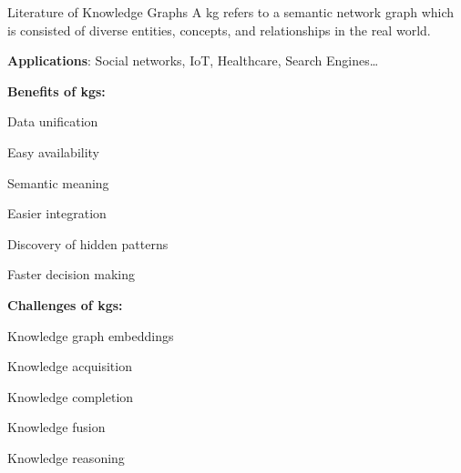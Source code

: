 \begin{tframe}{Literature of Knowledge Graphs}
    A \gls{kg} refers to a semantic network graph which is consisted of diverse entities, concepts, and relationships in the real world. %
    \vspace{0.2cm}

    \textbf{Applications}: Social networks, IoT, Healthcare, Search Engines\ldots
    \vspace{0.2cm}

    \begin{minipage}[t]{.5\linewidth}
        \textbf{Benefits of \glspl{kg}:}
        \begin{adv}
            \item Data unification
            \item Easy availability
            \item Semantic meaning
            \item Easier integration
            \item Discovery of hidden patterns
            \item Faster decision making
        \end{adv}
    \end{minipage}%
    \hfill%
    \begin{minipage}[t]{.5\linewidth}
        \textbf{Challenges of \glspl{kg}:}
        \begin{disadv}
            \item Knowledge graph embeddings
            \item Knowledge acquisition
            \item Knowledge completion
            \item Knowledge fusion
            \item Knowledge reasoning
        \end{disadv}
    \end{minipage}
\end{tframe}